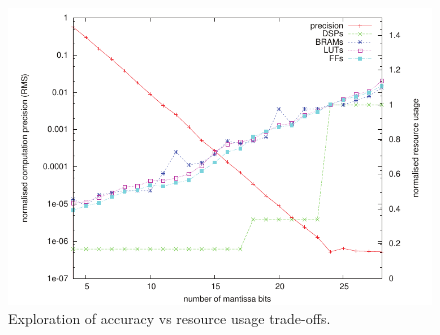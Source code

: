 \begin{figure}[!h]
\includegraphics[scale=0.7]{figs/pre}
\caption{Exploration of accuracy vs resource usage trade-offs.}
\label{fig:precision}
\end{figure}

